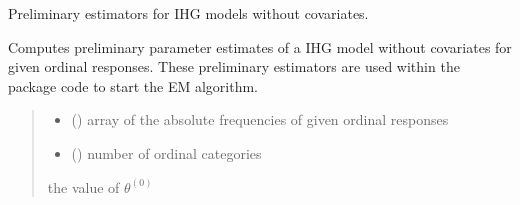 \documentclass[letterpaper,10pt,english]{sphinxmanual}
\begin{document}
\begin{fulllineitems}
\label{\detokenize{cubmods:cubmods.ihg.init_theta}}
\pysigstartsignatures
{}
\pysigstopsignatures
\sphinxAtStartPar
Preliminary estimators for IHG models without covariates.

\sphinxAtStartPar
Computes preliminary parameter estimates of a IHG model without covariates for given ordinal
responses. These preliminary estimators are used within the package code to start the E\sphinxhyphen{}M algorithm.
\begin{quote}\begin{description}
\begin{itemize}
\item {} 
\sphinxAtStartPar
{} () \textendash{} array of the absolute frequencies of given ordinal responses

\item {} 
\sphinxAtStartPar
{} () \textendash{} number of ordinal categories

\end{itemize}

\sphinxAtStartPar
the value of \(\theta^{(0)}\)

\end{description}\end{quote}

\end{fulllineitems}

\end{document}
